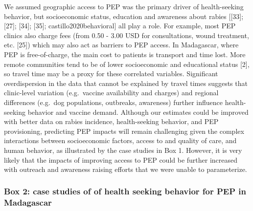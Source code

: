 \documentclass[
  oneside]{book}
\begin{document}
We assumed geographic access to PEP was the primary driver of
health-seeking behavior, but socioeconomic status, education and
awareness about rabies {[}{[}33{]}; {[}27{]}; {[}34{]}; {[}35{]};
castillo2020behavioral{]} all play a role. For example, most PEP clinics
also charge fees (from 0.50 - 3.00 USD for consultations, wound
treatment, etc. {[}25{]}) which may also act as barriers to PEP access. In
Madagascar, where PEP is free-of-charge, the main cost to patients is
transport and time lost. More remote communities tend to be of lower
socioeconomic and educational status {[}2{]}, so travel time may be a
proxy for these correlated variables. Significant overdispersion in the
data that cannot be explained by travel times suggests that clinic-level
variation (e.g.~vaccine availability and charges) and regional
differences (e.g.~dog populations, outbreaks, awareness) further
influence health-seeking behavior and vaccine demand. Although our
estimates could be improved with better data on rabies incidence,
health-seeking behavior, and PEP provisioning, predicting PEP impacts
will remain challenging given the complex interactions between
socioeconomic factors, access to and quality of care, and human
behavior, as illustrated by the case studies in Box 1. However, it is
very likely that the impacts of improving access to PEP could be further
increased with outreach and awareness raising efforts that we were
unable to parameterize.

\hypertarget{box-2-case-studies-of-of-health-seeking-behavior-for-pep-in-madagascar}{%
\subsubsection{Box 2: case studies of of health seeking behavior for PEP in Madagascar}\label{box-2-case-studies-of-of-health-seeking-behavior-for-pep-in-madagascar}}
\end{document}
